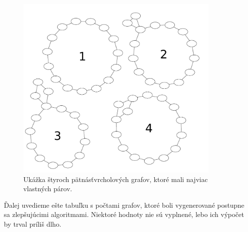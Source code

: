 \begin{figure}
\centerline{\includegraphics[width=0.9\textwidth]{images/best_ec2.pdf}}

\caption[$2$-hranovo súvislé grafy s najviac vlastnými pármi]{Ukážka štyroch pätnásťvrcholových
grafov, ktoré mali najviac vlastných párov.}

\label{graf:bestec2}
\end{figure}

Ďalej uvedieme ešte tabuľku s počtami grafov, ktoré boli vygenerované postupne sa zlepšujúcimi
algoritmami. Niektoré hodnoty nie sú vyplnené, lebo ich výpočet by trval príliš dlho.

